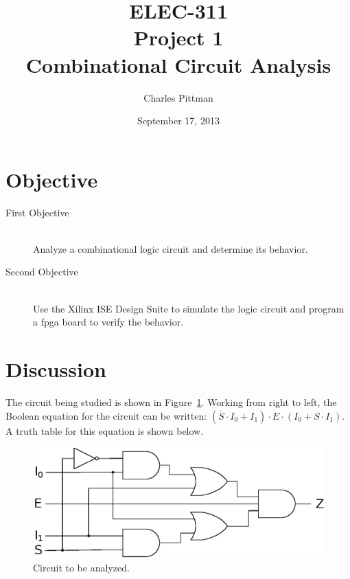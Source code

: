 \documentclass{article}
\author{Charles Pittman}
\title{ELEC-311\\ Project 1\\ Combinational Circuit Analysis}
\date{September 17, 2013}
\begin{document}
\maketitle %

\pagebreak


\renewcommand{\labelenumi}{\alph{enumi}.}

\section{Objective}
\label{sec:objective}

 \begin{description}
 \item[First Objective] \hfill \\
   Analyze a combinational logic circuit and determine its behavior.
 \item[Second Objective] \hfill \\
   Use the Xilinx ISE Design Suite to simulate the logic circuit and
   program a \gls{fpga} board to verify the behavior.
 \end{description}

\section{Discussion}
\label{sec:procedure}

The circuit being studied is shown in Figure~\ref{fig:circuit}.
Working from right to left, the Boolean equation for the circuit can
be written: $(\overline{S} \cdot I_0 + I_1) \cdot E \cdot (I_0 + S
\cdot I_1)$.  A truth table for this equation is shown below.
\begin{figure}[hbtp]
  \centering
  \includegraphics[width=\textwidth]{img/circuit}
  \caption{Circuit to be analyzed.}
  \label{fig:circuit}
\end{figure}
\end{document}
